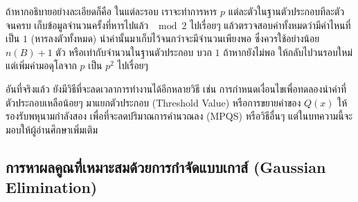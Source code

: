 \documentclass[20pt,a4paper]{article}
\begin{document}
\vspace{4mm}

ถ้าหากอธิบายอย่างละเอียดก็คือ ในแต่ละรอบ เราจะทำการหาร $p$ แต่ละตัวในฐานตัวประกอบทีละตัวจนครบ เก็บข้อมูลจำนวนครั้งที่หารไปแล้ว $\mod 2$ ไปเรื่อยๆ แล้วตรวจสอบค่าทั้งหมดว่ามีค่าไหนที่เป็น $1$ (หารลงตัวทั้งหมด) นำค่านั้นมาเก็บไว้จนกว่าจะมีจำนวนเพียงพอ ซึ่งควรใช้อย่างน้อย $n(B) + 1$ ตัว หรือเท่ากับจำนวนในฐานตัวประกอบ บวก $1$ ถ้าหากยังไม่พอ ให้กลับไปวนรอบใหม่ แต่เพิ่มค่ามอดุโลจาก $p$ เป็น $p^2$ ไปเรื่อยๆ

อันที่จริงแล้ว ยังมีวิธีที่จะลดเวลาการทำงานได้อีกหลายวิธี เช่น การกำหนดเงื่อนไขเพื่อทดลองนำค่าที่ตัวประกอบเหลือน้อยๆ มาแยกตัวประกอบ (Threshold Value) หรือการขยายค่าของ $Q(x)$ ให้รองรับพหุนามกำลังสอง เพื่อที่จะลดปริมาณการคำนวณลง (MPQS) หรือวิธีอื่นๆ แต่ในบทความนี้จะมอบให้ผู้อ่านศึกษาเพิ่มเติม

\subsection{การหาผลคูณที่เหมาะสมด้วยการกำจัดแบบเกาส์ (Gaussian Elimination)}
\end{document}
